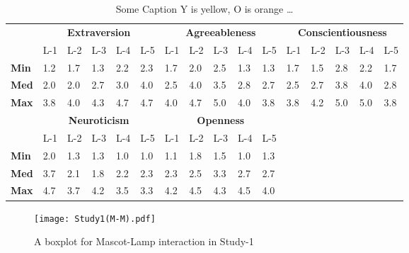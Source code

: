 \begin{table}[H]
    \renewcommand{\arraystretch}{1.2}
    \caption{Some Caption Y is yellow, O is orange \ldots}
    \label{table:medianMM1}
    \begin{center}
        \begin{tabular}{p{}|
        p{}|p{}|p{}|p{}|p{}||
        p{}|p{}|p{}|p{}|p{}||
        p{}|p{}|p{}|p{}|p{}|}
            \cline{2-16}
            & \multicolumn{5}{c||}{\textbf{Extraversion}} & \multicolumn{5}{c||}{\textbf{Agreeableness}}
            & \multicolumn{5}{c|}{\textbf{Conscientiousness}} \\
            \cline{2-16}
            & L-1 & L-2 & L-3 & L-4 & L-5 			    & L-1 & L-2 & L-3 & L-4 & L-5   	 	& L-1 & L-2 & L-3 & L-4 & L-5      \\
            \cline{2-16}
            \textbf{Min}  	& 1.2 & 1.7 & 1.3 & 2.2 & 2.3 		& 1.7 & 2.0 & 2.5 & 1.3 & 1.3  	& 1.7 & 1.5 & 2.8 & 2.2 & 1.7  \\
            \textbf{Med} 	& 2.0 & 2.0 & 2.7 & 3.0 & 4.0 		& 2.5 & 4.0 & 3.5 & 2.8 & 2.7  	& 2.5 & 2.7 & 3.8 & 4.0 & 2.8  \\
            \textbf{Max}	& 3.8 & 4.0 & 4.3 & 4.7 & 4.7 		& 4.0 & 4.7 & 5.0 & 4.0 & 3.8  	& 3.8 & 4.2 & 5.0 & 5.0 & 3.8 \\
            \cline{2-16}
            \cline{2-11}
            &  \multicolumn{5}{|c||}{\textbf{Neuroticism}} & \multicolumn{5}{|c||}{\textbf{Openness}} \\
            \cline{2-11}
            & L-1 & L-2 & L-3 & L-4 & L-5  			& L-1 & L-2 & L-3 & L-4 & L-5     		\\
            \cline{2-11}
            \textbf{Min} 	& 2.0 & 1.3 & 1.3 & 1.0 & 1.0 		& 1.1 & 1.8 & 1.5 & 1.0 & 1.3 	\\
            \textbf{Med}    & 3.7 & 2.1 & 1.8 & 2.2 & 2.3 	    & 2.3 & 2.5 & 3.3 & 2.7 & 2.7 	\\
            \textbf{Max}  	& 4.7 & 3.7 & 4.2 & 3.5 & 3.3 		& 4.2 & 4.5 & 4.3 & 4.5 & 4.0  	\\
            \cline{2-11}
        \end{tabular}
    \end{center}
\end{table}

\begin{figure}[H]
    \centering
    \texttt{[image: Study1(M-M).pdf]}
    \caption{A boxplot for Mascot-Lamp interaction in Study-1}
    \label{fig:MM1}
\end{figure}

